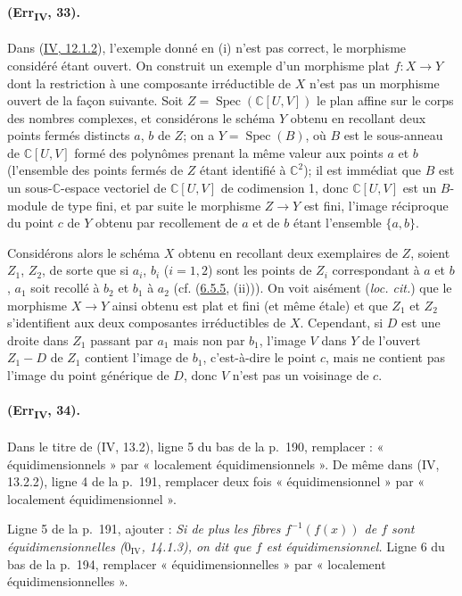 \paragraph{(Err\textsubscript{IV}, 33).}
Dans ({\hyperlink{ega4.c04.item.12-1-2}{IV, 12.1.2}}), l'exemple donné
en (i) n'est pas correct, le morphisme considéré étant ouvert. On
construit un exemple d'un morphisme plat $f:X\to Y$ dont la restriction
à une composante irréductible de $X$ n'est pas un morphisme ouvert de
la façon suivante. Soit $Z=\operatorname{Spec}(\mathbb C[U,V])$ le
plan affine sur le corps des nombres complexes, et considérons le
schéma $Y$ obtenu en recollant deux points fermés distincts $a$, $b$ de
$Z$; on a $Y=\operatorname{Spec}(B)$, où $B$ est le sous-anneau de
$\mathbb C[U,V]$ formé des polynômes prenant la même valeur aux points
$a$ et $b$ (l'ensemble des points fermés de $Z$ étant identifié à
$\mathbb C^2$); il est immédiat que $B$ est un sous-$\mathbb C$-espace
vectoriel de $\mathbb C[U,V]$ de codimension 1, donc $\mathbb C[U,V]$
est un $B$-module de type fini, et par suite le morphisme $Z\to Y$ est
fini, l'image réciproque du point $c$ de $Y$ obtenu par recollement de
$a$ et de $b$ étant l'ensemble $\{a,b\}$.

Considérons alors le schéma $X$ obtenu en recollant deux exemplaires de
$Z$, soient $Z_1$, $Z_2$, de sorte que si $a_i$, $b_i$ ($i=1,2$) sont
les points de $Z_i$ correspondant à $a$ et $b$, $a_1$ soit recollé à
$b_2$ et $b_1$ à $a_2$ (cf. ({\hyperlink{ega4.c04.item.6-5-5}{6.5.5}},
(ii))). On voit aisément (\emph{loc. cit.}) que le morphisme $X\to Y$
ainsi obtenu est plat et fini (et même étale) et que $Z_1$ et $Z_2$
s'identifient aux deux composantes irréductibles de $X$. Cependant, si
$D$ est une droite dans $Z_1$ passant par $a_1$ mais non par $b_1$,
l'image $V$ dans $Y$ de l'ouvert $Z_1-D$ de $Z_1$ contient l'image de
$b_1$, c'est-à-dire le point $c$, mais ne contient pas l'image du point
générique de $D$, donc $V$ n'est pas un voisinage de $c$.

\paragraph{(Err\textsubscript{IV}, 34).}
Dans le titre de (IV, 13.2), ligne 5 du bas de la p.~190, remplacer :
« équidimensionnels » par « localement équidimensionnels ». De même
dans (IV, 13.2.2), ligne 4 de la p.~191, remplacer deux fois
« équidimensionnel » par « localement équidimensionnel ».

Ligne 5 de la p.~191, ajouter : \emph{Si de plus les fibres
$f^{-1}(f(x))$ de $f$ sont équidimensionnelles ($0_{\mathrm{IV}}$,
14.1.3), on dit que $f$ est équidimensionnel.} Ligne 6 du bas de la
p.~194, remplacer « équidimensionnelles » par « localement
équidimensionnelles ».

